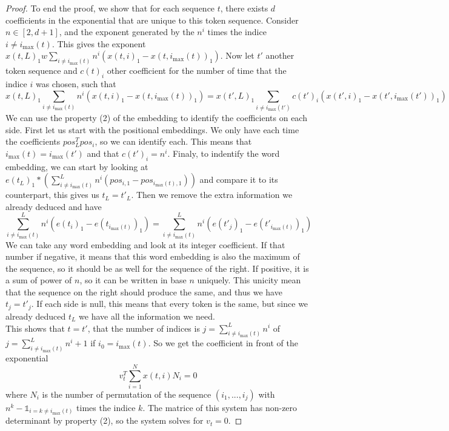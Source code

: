 \documentclass{article}
\begin{document}
\begin{proof}
    To end the proof, we show that for each sequence $t$, there exists $d$ coefficients in the exponential that are unique to this 
    token sequence. Consider $n\in [2, d+1]$, and the exponent generated by the $n^i$ times the indice $i\neq i_{\max}(t)$. This
    gives the exponent $x(t,L)_1w\sum_{i\neq i_{\max}(t)}n^i(x(t,i)_1 - x(t,i_{\max}(t))_1)$. Now let $t'$ another token sequence and 
    $c(t)_i$ other coefficient for the number of time that the indice $i$ was chosen, such that
    \[x(t,L)_1\sum_{i\neq i_{\max}(t)}n^i(x(t,i)_1 - x(t,i_{\max}(t))_1) = x(t',L)_1\sum_{i\neq i_{\max}(t')}c(t')_i(x(t',i)_1 - x(t',i_{\max}(t'))_1)\]
    We can use the property (2) of the embedding to identify the coefficients on each side.
    First let us start with the positional embeddings. We only have each time the coefficients $pos_L^Tpos_i$, so we can identify each. 
    This means that $i_{\max}(t) = i_{\max}(t')$ and that $c(t')_i = n^i$.
    Finaly, to indentify the word embedding, we can start by looking at 
    $e(t_L)_1*\left(\sum_{i\neq i_{\max}(t)}^Ln^i(pos_{i, 1} - pos_{i_{\max}(t), 1})\right)$
    and compare it to its counterpart, this gives us $t_L = t'_L$.
    Then we remove the extra information we already deduced and have
    \[\sum_{i\neq i_{\max}(t)}^Ln^i(e(t_i)_1 - e(t_{i_{\max}(t)})_1) = \sum_{i\neq i_{\max}(t)}^Ln^i(e(t'_j)_1 - e(t'_{i_{\max}(t)})_1)\]
    We can take any word embedding and look at its integer coefficient.
    If that number if negative, it means that this word embedding is also the maximum of the sequence, so it should be as well for
    the sequence of the right. 
    If positive, it is a sum of power of $n$, so it can be written in base $n$ uniquely. This unicity mean 
    that the sequence on the right should produce the same, and thus we have $t_j = t'_j$. 
    If each side is null, this means that every token is the same, but since we already deduced 
    $t_L$ we have all the information we need.
    \\

    This shows that $t = t'$, that the number of indices is $j = \sum_{i\neq i_{\max}(t)}^Ln^i$ of $j = \sum_{i\neq i_{\max}(t)}^Ln^i+1$
    if $i_0 = i_{\max}(t)$. So we get the coefficient in front of the exponential
    \[v_t^T\sum_{i=1}^{N}x(t,i)N_i = 0\] where $N_i$ is the number of permutation of the sequence $(i_1, ..., i_j)$ with 
    $n^k - \mathbb{1}_{i=k\neq i_{\max}(t)}$ times the indice $k$.
    The matrice of this system has non-zero determinant by property (2), so the system solves for $v_t = 0$.
\end{proof}
\end{document}
